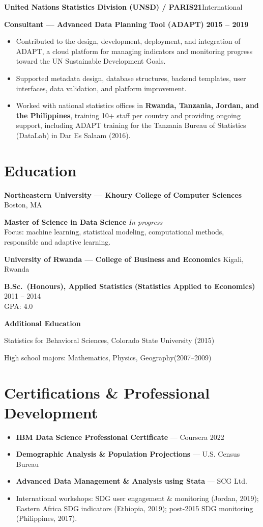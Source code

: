 \documentclass[10pt,letterpaper]{article}
\newcommand{\job}[4]{%
  \par\vspace{4pt}
  {\color{navy}\bfseries\large #1}\hfill{\color{muted}\small #2}\par\vspace{1pt}
  {\color{accent}\bfseries #3}\hfill{\small\bfseries\color{ink} #4}\par\vspace{1pt}}
\newcommand{\entry}[3]{%
  \par\vspace{4pt}
  {\bfseries\color{navy} #1}\hfill{\small\color{muted} #2}\par
  {\small #3}\par}
\begin{document}
\job{United Nations Statistics Division (UNSD) / PARIS21}{International}
    {Consultant --- Advanced Data Planning Tool (ADAPT)}{2015 -- 2019}
\begin{itemize}
  \item Contributed to the design, development, deployment, and integration of ADAPT, a cloud platform for managing indicators and monitoring progress toward the UN Sustainable Development Goals.
  \item Supported metadata design, database structures, backend templates, user interfaces, data validation, and platform improvement.
  \item Worked with national statistics offices in \textbf{Rwanda, Tanzania, Jordan, and the Philippines}, training 10+ staff per country and providing ongoing support, including ADAPT training for the Tanzania Bureau of Statistics (DataLab) in Dar Es Salaam (2016).
\end{itemize}

\section{Education}
\entry{Northeastern University --- Khoury College of Computer Sciences}{Boston, MA}
  {\textcolor{accent}{\bfseries Master of Science in Data Science} \hfill \textit{In progress}\\
   Focus: machine learning, statistical modeling, computational methods, responsible and adaptive learning.}

\entry{University of Rwanda --- College of Business and Economics}{Kigali, Rwanda}
  {\textcolor{accent}{\bfseries B.Sc.\ (Honours), Applied Statistics (Statistics Applied to Economics)} \hfill 2011 -- 2014\\
   GPA: 4.0}

\entry{Additional Education}{}
  {Statistics for Behavioral Sciences, Colorado State University (2015)}
  {High school majors: Mathematics, Physics, Geography(2007--2009)}

\section{Certifications \& Professional Development}
\begin{itemize}
  \item \textbf{IBM Data Science Professional Certificate} --- Coursera \hfill {\small\color{muted}2022} %
  \item \textbf{Demographic Analysis \& Population Projections} --- U.S. Census Bureau %
  \item \textbf{Advanced Data Management \& Analysis using Stata} --- SCG Ltd. %
  \item International workshops: SDG user engagement \& monitoring (Jordan, 2019); Eastern Africa SDG indicators (Ethiopia, 2019); post-2015 SDG monitoring (Philippines, 2017).
\end{itemize}
\end{document}
